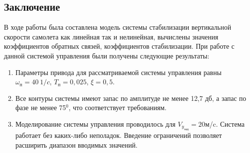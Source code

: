\newpage
\begin{center}
    \section*{Заключение}
\end{center}

В ходе работы была составлена модель системы стабилизации вертикальной скорости самолета как линейная так и нелинейная, вычислены значения коэффициентов обратных связей, коэффициентов стабилизации. При работе с данной системой управления были получены следующие результаты:
\begin{enumerate}
    \item Параметры привода для рассматриваемой системы управления равны $\omega_\text{п} = 40 \ 1/c$, $T_\text{п} = 0,025$, $\xi = 0,5$.
    \item Все контуры системы имеют запас по амплитуде не менее 12,7 дб, а запас по фазе не менее 75$^0$, что соответствует требованиям.
    \item Моделирование системы управления проводилось для $V_y_{\text{зад}}= 20 $м/c. Система работает без каких-либо неполадок. Введение ограничений позволяет расширить диапазон вводимых значений.
\end{enumerate}


